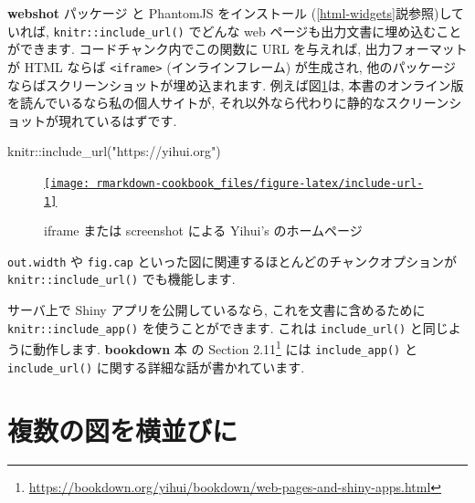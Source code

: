 \documentclass[
  11pt,
]{bxjsreport}
\newenvironment{Shaded}{\begin{snugshade}}{\end{snugshade}}
\newcommand{\FunctionTok}[1]{\textcolor[rgb]{0.00,0.00,0.00}{#1}}
\newcommand{\NormalTok}[1]{#1}
\newcommand{\SpecialCharTok}[1]{\textcolor[rgb]{0.00,0.00,0.00}{#1}}
\newcommand{\StringTok}[1]{\textcolor[rgb]{0.31,0.60,0.02}{#1}}
\let\oldhref\href
\renewcommand{\href}[2]{#2\footnote{\url{#1}}}
\begin{document}
\textbf{webshot} パッケージ \autocite{R-webshot} と PhantomJS をインストール (\ref{html-widgets}説参照)していれば, \texttt{knitr::include\_url()} でどんな web ページも出力文書に埋め込むことができます. コードチャンク内でこの関数に URL を与えれば, 出力フォーマットが HTML ならば \texttt{\textless{}iframe\textgreater{}} (インラインフレーム) が生成され, 他のパッケージならばスクリーンショットが埋め込まれます. 例えば図\ref{fig:include-url}は, 本書のオンライン版を読んでいるなら私の個人サイトが, それ以外なら代わりに静的なスクリーンショットが現れているはずです.

\let\ooldhref\href
\let\href\oldhref

\begin{Shaded}
\begin{Highlighting}[numbers=left,,]
\NormalTok{knitr}\SpecialCharTok{::}\FunctionTok{include\_url}\NormalTok{(}\StringTok{"https://yihui.org"}\NormalTok{)}
\end{Highlighting}
\end{Shaded}

\begin{figure}

{\centering \oldhref{https://yihui.org}{\texttt{[image: rmarkdown-cookbook\_files/figure-latex/include-url-1]} }

}

\caption{iframe または screenshot による Yihui's のホームページ}\label{fig:include-url}
\end{figure}

\let\href\ooldhref

\texttt{out.width} や \texttt{fig.cap} といった図に関連するほとんどのチャンクオプションが \texttt{knitr::include\_url()} でも機能します.

サーバ上で Shiny アプリを公開しているなら, これを文書に含めるために \texttt{knitr::include\_app()} を使うことができます. これは \texttt{include\_url()} と同じように動作します. \textbf{bookdown} 本 \autocite{bookdown2016} の \href{https://bookdown.org/yihui/bookdown/web-pages-and-shiny-apps.html}{Section 2.11} には \texttt{include\_app()} と \texttt{include\_url()} に関する詳細な話が書かれています.

\hypertarget{figures-side}{%
\section{複数の図を横並びに}\label{figures-side}}
\end{document}
